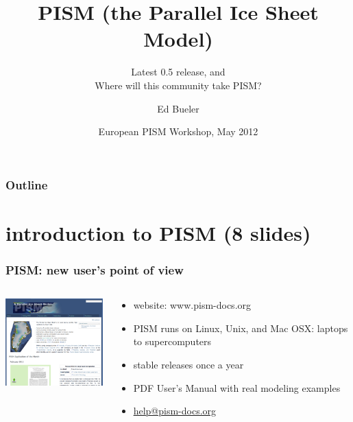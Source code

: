 \documentclass[hide notes,intlimits]{beamer}
\title[PISM (the Parallel Ice Sheet Model)] %
{PISM (the Parallel Ice Sheet Model)}
\subtitle{Latest 0.5 release, and \\ Where will this community take PISM?}
\author[Bueler]{Ed Bueler}
\institute{
University of Alaska Fairbanks
}
\date{European PISM Workshop, May 2012}
\begin{document}


{
} 

\begin{frame}
  \titlepage
\end{frame}

{
}

\begin{frame}
   \frametitle{Outline}
   \tableofcontents[subsectionstyle=hide/hide/hide]
\end{frame}


\section[introduction]{introduction to PISM (8 slides)}

\begin{frame}
  \frametitle{PISM: new user's point of view}
  \begin{columns}
    \begin{column}{50mm}
      \includegraphics[width=50mm]{pismdocs.png}
    \end{column}
    \begin{column}{70mm}
      \begin{itemize}
      \item website: \alert{www.pism-docs.org}
      \item PISM runs on Linux, Unix, and Mac OSX: laptops to supercomputers
      \item stable releases once a year
      \item PDF User's Manual with real modeling examples
      \item \url{help@pism-docs.org}
      \end{itemize}
    \end{column}
  \end{columns}
\end{frame}
\end{document}
